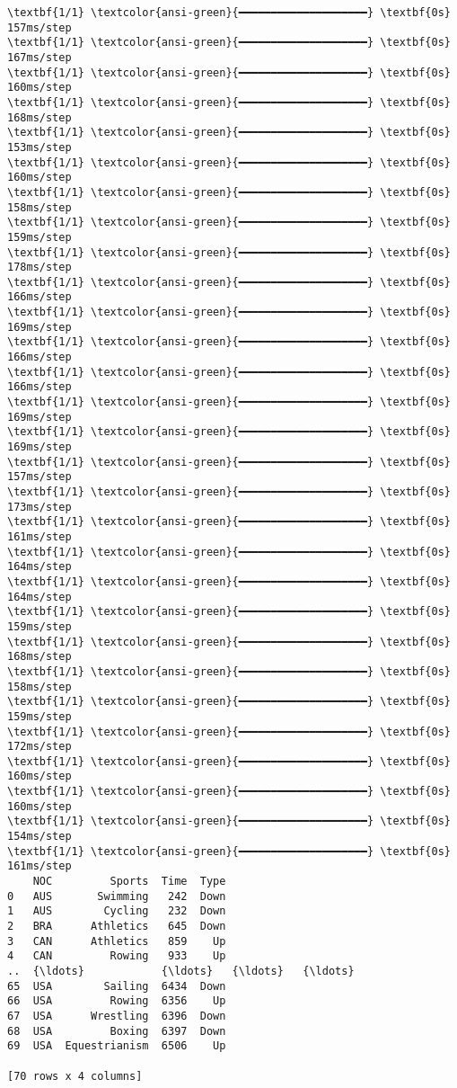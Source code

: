 \documentclass[11pt]{article}
\begin{document}
\begin{Verbatim}[commandchars=\\\{\}]
\textbf{1/1} \textcolor{ansi-green}{━━━━━━━━━━━━━━━━━━━━} \textbf{0s} 157ms/step
\textbf{1/1} \textcolor{ansi-green}{━━━━━━━━━━━━━━━━━━━━} \textbf{0s} 167ms/step
\textbf{1/1} \textcolor{ansi-green}{━━━━━━━━━━━━━━━━━━━━} \textbf{0s} 160ms/step
\textbf{1/1} \textcolor{ansi-green}{━━━━━━━━━━━━━━━━━━━━} \textbf{0s} 168ms/step
\textbf{1/1} \textcolor{ansi-green}{━━━━━━━━━━━━━━━━━━━━} \textbf{0s} 153ms/step
\textbf{1/1} \textcolor{ansi-green}{━━━━━━━━━━━━━━━━━━━━} \textbf{0s} 160ms/step
\textbf{1/1} \textcolor{ansi-green}{━━━━━━━━━━━━━━━━━━━━} \textbf{0s} 158ms/step
\textbf{1/1} \textcolor{ansi-green}{━━━━━━━━━━━━━━━━━━━━} \textbf{0s} 159ms/step
\textbf{1/1} \textcolor{ansi-green}{━━━━━━━━━━━━━━━━━━━━} \textbf{0s} 178ms/step
\textbf{1/1} \textcolor{ansi-green}{━━━━━━━━━━━━━━━━━━━━} \textbf{0s} 166ms/step
\textbf{1/1} \textcolor{ansi-green}{━━━━━━━━━━━━━━━━━━━━} \textbf{0s} 169ms/step
\textbf{1/1} \textcolor{ansi-green}{━━━━━━━━━━━━━━━━━━━━} \textbf{0s} 166ms/step
\textbf{1/1} \textcolor{ansi-green}{━━━━━━━━━━━━━━━━━━━━} \textbf{0s} 166ms/step
\textbf{1/1} \textcolor{ansi-green}{━━━━━━━━━━━━━━━━━━━━} \textbf{0s} 169ms/step
\textbf{1/1} \textcolor{ansi-green}{━━━━━━━━━━━━━━━━━━━━} \textbf{0s} 169ms/step
\textbf{1/1} \textcolor{ansi-green}{━━━━━━━━━━━━━━━━━━━━} \textbf{0s} 157ms/step
\textbf{1/1} \textcolor{ansi-green}{━━━━━━━━━━━━━━━━━━━━} \textbf{0s} 173ms/step
\textbf{1/1} \textcolor{ansi-green}{━━━━━━━━━━━━━━━━━━━━} \textbf{0s} 161ms/step
\textbf{1/1} \textcolor{ansi-green}{━━━━━━━━━━━━━━━━━━━━} \textbf{0s} 164ms/step
\textbf{1/1} \textcolor{ansi-green}{━━━━━━━━━━━━━━━━━━━━} \textbf{0s} 164ms/step
\textbf{1/1} \textcolor{ansi-green}{━━━━━━━━━━━━━━━━━━━━} \textbf{0s} 159ms/step
\textbf{1/1} \textcolor{ansi-green}{━━━━━━━━━━━━━━━━━━━━} \textbf{0s} 168ms/step
\textbf{1/1} \textcolor{ansi-green}{━━━━━━━━━━━━━━━━━━━━} \textbf{0s} 158ms/step
\textbf{1/1} \textcolor{ansi-green}{━━━━━━━━━━━━━━━━━━━━} \textbf{0s} 159ms/step
\textbf{1/1} \textcolor{ansi-green}{━━━━━━━━━━━━━━━━━━━━} \textbf{0s} 172ms/step
\textbf{1/1} \textcolor{ansi-green}{━━━━━━━━━━━━━━━━━━━━} \textbf{0s} 160ms/step
\textbf{1/1} \textcolor{ansi-green}{━━━━━━━━━━━━━━━━━━━━} \textbf{0s} 160ms/step
\textbf{1/1} \textcolor{ansi-green}{━━━━━━━━━━━━━━━━━━━━} \textbf{0s} 154ms/step
\textbf{1/1} \textcolor{ansi-green}{━━━━━━━━━━━━━━━━━━━━} \textbf{0s} 161ms/step
    NOC         Sports  Time  Type
0   AUS       Swimming   242  Down
1   AUS        Cycling   232  Down
2   BRA      Athletics   645  Down
3   CAN      Athletics   859    Up
4   CAN         Rowing   933    Up
..  {\ldots}            {\ldots}   {\ldots}   {\ldots}
65  USA        Sailing  6434  Down
66  USA         Rowing  6356    Up
67  USA      Wrestling  6396  Down
68  USA         Boxing  6397  Down
69  USA  Equestrianism  6506    Up

[70 rows x 4 columns]
    \end{Verbatim}
\end{document}
